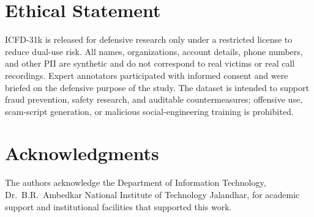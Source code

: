\documentclass{article}
\newcommand{\crchange}[1]{{\color{blue}#1}}
\begin{document}
\section*{Ethical Statement}
\crchange{ICFD-31k is released for defensive research only under a restricted license to reduce dual-use risk. All names, organizations, account details, phone numbers, and other PII are synthetic and do not correspond to real victims or real call recordings. Expert annotators participated with informed consent and were briefed on the defensive purpose of the study. The dataset is intended to support fraud prevention, safety research, and auditable countermeasures; offensive use, scam-script generation, or malicious social-engineering training is prohibited.}

\section*{Acknowledgments}
The authors acknowledge the Department of Information Technology, Dr.\ B.R.\ Ambedkar National Institute of Technology Jalandhar, for academic support and institutional facilities that supported this work.

\clearpage



\newpage
\newpage
\newpage
\clearpage
\appendix
\renewcommand{\thetable}{A\arabic{table}}
\renewcommand{\thefigure}{A\arabic{figure}}
\setcounter{table}{0}
\setcounter{figure}{0}
\end{document}
